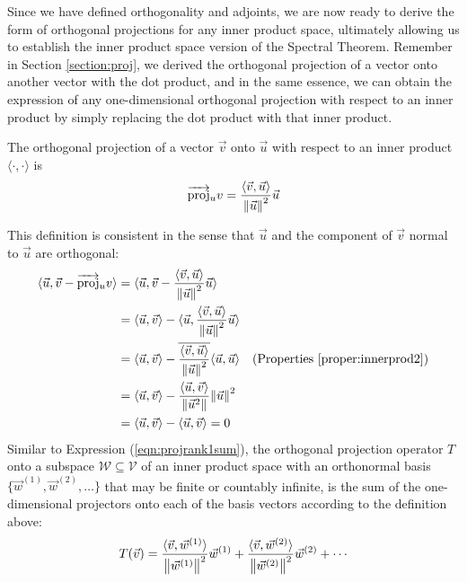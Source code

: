 Since we have defined orthogonality and adjoints, we are now ready to derive the form of orthogonal projections for any inner product space, ultimately allowing us to establish the inner product space version of the Spectral Theorem. Remember in Section \ref{section:proj}, we derived the orthogonal projection of a vector onto another vector with the dot product, and in the same essence, we can obtain the expression of any one-dimensional orthogonal projection with respect to an inner product by simply replacing the dot product with that inner product.
\begin{defn}
\label{defn:orthoprojinner}
The orthogonal projection of a vector $\vec{v}$ onto $\vec{u}$ with respect to an inner product $\langle \cdot, \cdot \rangle$ is
\begin{align}
\overrightarrow{\text{proj}}_u v = \frac{\langle \vec{v}, \vec{u}\rangle}{\norm{\vec{u}}^2} \vec{u}
\end{align}
\end{defn}
This definition is consistent in the sense that $\vec{u}$ and the component of $\vec{v}$ normal to $\vec{u}$ are orthogonal:
\begin{align*}
\langle \vec{u}, \vec{v} - \overrightarrow{\text{proj}}_u v \rangle &= \langle \vec{u}, \vec{v} - \frac{\langle \vec{v}, \vec{u}\rangle}{\norm{\vec{u}}^2} \vec{u} \rangle \\
&= \langle \vec{u}, \vec{v} \rangle - \langle \vec{u}, \frac{\langle \vec{v}, \vec{u}\rangle}{\norm{\vec{u}}^2} \vec{u} \rangle \\
&= \langle \vec{u}, \vec{v} \rangle - \overline{\frac{\langle \vec{v}, \vec{u}\rangle}{\norm{\vec{u}}^2}} \langle \vec{u}, \vec{u} \rangle & \text{(Properties \ref{proper:innerprod2})}\\
&= \langle \vec{u}, \vec{v} \rangle - \frac{\langle \vec{u}, \vec{v}\rangle}{\norm{\vec{u}^2}} {\norm{\vec{u}}^2} \\
&= \langle \vec{u}, \vec{v} \rangle -  \langle \vec{u}, \vec{v} \rangle = 0
\end{align*}
Similar to Expression (\ref{eqn:projrank1sum}), the orthogonal projection operator $T$ onto a subspace $\mathcal{W} \subseteq \mathcal{V}$ of an inner product space with an orthonormal basis $\{\vec{w}^{(1)}, \vec{w}^{(2)}, \ldots\}$ that may be finite or countably infinite, is the sum of the one-dimensional projectors onto each of the basis vectors according to the definition above:
\begin{align}
T(\vec{v}) = \frac{\langle \vec{v}, \vec{w}^{(1)}\rangle}{\norm{\vec{w}^{(1)}}^2} \vec{w}^{(1)} + \frac{\langle \vec{v}, \vec{w}^{(2)}\rangle}{\norm{\vec{w}^{(2)}}^2} \vec{w}^{(2)} + \cdots \label{eqn:orthoprojinner}
\end{align}
